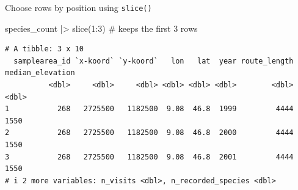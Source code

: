 \documentclass[
  ignorenonframetext,
  aspectratio=169,
]{beamer}
\newenvironment{Shaded}{\begin{snugshade}}{\end{snugshade}}
\newcommand{\CommentTok}[1]{\textcolor[rgb]{0.37,0.37,0.37}{#1}}
\newcommand{\DecValTok}[1]{\textcolor[rgb]{0.68,0.00,0.00}{#1}}
\newcommand{\FunctionTok}[1]{\textcolor[rgb]{0.28,0.35,0.67}{#1}}
\newcommand{\NormalTok}[1]{\textcolor[rgb]{0.00,0.23,0.31}{#1}}
\newcommand{\SpecialCharTok}[1]{\textcolor[rgb]{0.37,0.37,0.37}{#1}}
\let\oldtexttt\texttt
\renewcommand{\texttt}[1]{\colorbox{gray!20}{\oldtexttt{#1}}}
\begin{document}
\begin{frame}[fragile]{Choose rows by position using \texttt{slice()}}
\protect{}\label{choose-rows-by-position-using-slice}
\footnotesize

\begin{Shaded}
\begin{Highlighting}[]
\NormalTok{species\_count }\SpecialCharTok{|\textgreater{}} \FunctionTok{slice}\NormalTok{(}\DecValTok{1}\SpecialCharTok{:}\DecValTok{3}\NormalTok{) }\CommentTok{\# keeps the first 3 rows}
\end{Highlighting}
\end{Shaded}

\begin{verbatim}
# A tibble: 3 x 10
  samplearea_id `x-koord` `y-koord`   lon   lat  year route_length median_elevation
          <dbl>     <dbl>     <dbl> <dbl> <dbl> <dbl>        <dbl>            <dbl>
1           268   2725500   1182500  9.08  46.8  1999         4444             1550
2           268   2725500   1182500  9.08  46.8  2000         4444             1550
3           268   2725500   1182500  9.08  46.8  2001         4444             1550
# i 2 more variables: n_visits <dbl>, n_recorded_species <dbl>
\end{verbatim}

\normalsize
\end{frame}
\end{document}
